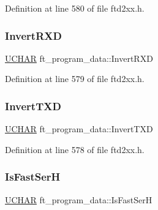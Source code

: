 Definition at line 580 of file ftd2xx.\+h.

\mbox{\label{structft__program__data_ad39202e4a8f2d3ed219b9853d7cdad19}} 
\subsubsection{\texorpdfstring{Invert\+R\+XD}{InvertRXD}}
{\footnotesize\ttfamily \hyperlink{CatCaloProto40MHz_2inc_2WinTypes_8h_a4f4bb67531a9bf6f0b9c6ad76aeba587}{U\+C\+H\+AR} ft\+\_\+program\+\_\+data\+::\+Invert\+R\+XD}



Definition at line 579 of file ftd2xx.\+h.

\mbox{\label{structft__program__data_a0d2de447606e38c05a02701aada981cf}} 
\subsubsection{\texorpdfstring{Invert\+T\+XD}{InvertTXD}}
{\footnotesize\ttfamily \hyperlink{CatCaloProto40MHz_2inc_2WinTypes_8h_a4f4bb67531a9bf6f0b9c6ad76aeba587}{U\+C\+H\+AR} ft\+\_\+program\+\_\+data\+::\+Invert\+T\+XD}



Definition at line 578 of file ftd2xx.\+h.

\mbox{\label{structft__program__data_a445221508c1c077d30621dfe20316f59}} 
\subsubsection{\texorpdfstring{Is\+Fast\+SerH}{IsFastSerH}}
{\footnotesize\ttfamily \hyperlink{CatCaloProto40MHz_2inc_2WinTypes_8h_a4f4bb67531a9bf6f0b9c6ad76aeba587}{U\+C\+H\+AR} ft\+\_\+program\+\_\+data\+::\+Is\+Fast\+SerH}



